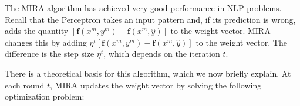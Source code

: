 The MIRA algorithm \citep{Crammer2002,Crammer2006}  has achieved very good performance in NLP problems. Recall that the Perceptron takes an input pattern and, if its prediction is wrong, adds the quantity $[\boldsymbol{f}(x^m,y^m) - \boldsymbol{f}(x^m,\hat{y})]$ to the weight vector. MIRA changes this by adding $\eta^t[\boldsymbol{f}(x^m,y^m) - \boldsymbol{f}(x^m,\hat{y})]$ to the weight vector. The difference is the step size $\eta^t$, which depends on the iteration $t$.

There is a theoretical basis for this algorithm, which we now briefly explain. At each round $t$, MIRA updates the weight vector by solving the following optimization problem: 


